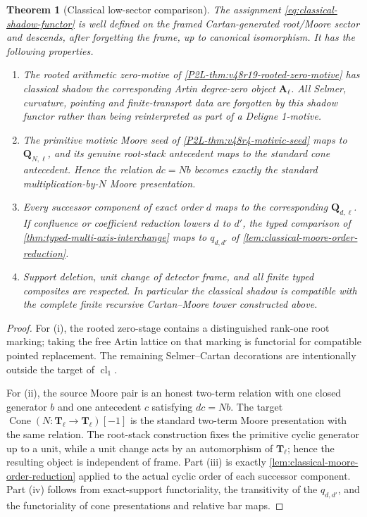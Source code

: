\documentclass[11pt]{article}
\newtheorem{theorem}{Theorem}[section]
\theoremstyle{remark}
\begin{document}
\begin{theorem}[Classical low-sector comparison]
\label{thm:classical-low-sector-comparison}
The assignment \eqref{eq:classical-shadow-functor} is well defined on the framed
Cartan-generated root/Moore sector and descends, after forgetting the frame, up to
canonical isomorphism.  It has the following properties.
\begin{enumerate}[label=\textup{(\roman*)}]
\item The rooted arithmetic zero-motive of
      \cref{P2L-thm:v48r19-rooted-zero-motive} has classical shadow the corresponding
      Artin degree-zero object $\mathbf A_\ell$.  All Selmer, curvature, pointing and
      finite-transport data are forgotten by this shadow functor rather than being
      reinterpreted as part of a Deligne 1-motive.
\item The primitive motivic Moore seed of
      \cref{P2L-thm:v48r4-motivic-seed} maps to $\mathbf Q_{N,\ell}$, and its genuine
      root-stack antecedent maps to the standard cone antecedent.  Hence the relation
      $dc=N b$ becomes exactly the standard multiplication-by-$N$ Moore presentation.
\item Every successor component of exact order $d$ maps to the corresponding
      $\mathbf Q_{d,\ell}$.  If confluence or coefficient reduction lowers $d$ to $d'$, the
      typed comparison of \cref{thm:typed-multi-axis-interchange} maps to
      $q_{d,d'}$ of \cref{lem:classical-moore-order-reduction}.
\item Support deletion, unit change of detector frame, and all finite typed composites
      are respected.  In particular the classical shadow is compatible with the complete
      finite recursive Cartan--Moore tower constructed above.
\end{enumerate}
\end{theorem}

\begin{proof}
For (i), the rooted zero-stage contains a distinguished rank-one root marking; taking the
free Artin lattice on that marking is functorial for compatible pointed replacement.  The
remaining Selmer--Cartan decorations are intentionally outside the target of
$\operatorname{cl}_1$.

For (ii), the source Moore pair is an honest two-term relation with one closed generator
$b$ and one antecedent $c$ satisfying $dc=N b$.  The target
$\operatorname{Cone}(N:\mathbf T_\ell\to\mathbf T_\ell)[-1]$ is the standard two-term
Moore presentation with the same relation.  The root-stack construction fixes the
primitive cyclic generator up to a unit, while a unit change acts by an automorphism of
$\mathbf T_\ell$; hence the resulting object is independent of frame.  Part (iii) is
exactly \cref{lem:classical-moore-order-reduction} applied to the actual cyclic order of
each successor component.  Part (iv) follows from exact-support functoriality, the
transitivity of the $q_{d,d'}$, and the functoriality of cone presentations and relative
bar maps.
\end{proof}
\end{document}
